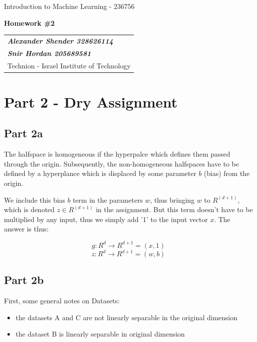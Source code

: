 \documentclass[a4paper]{iacas}
\begin{document}
\begin{center}
 \large Introduction to Machine Learning - 236756
 \end{center}
\begin{center}
\large\textbf{Homework \#2}
 \end{center}


\begin{tabular}{l}
\\
{\bf\textit{Alexander Shender 328626114}} \\
{\bf\textit{Snir Hordan 205689581}} \\
Technion - Israel Institute of Technology
\end{tabular}

\vspace{2em}

\section{Part 2 - Dry Assignment}

\subsection{Part 2a}
The halfspace is homogeneous if the hyperpalce which defines them passed through the origin.
Subsequently, the non-homogeneous halfspaces have to be defined by a hyperplance which is displaced by some parameter
$b$ (bias) from the origin.

We include this bias $b$ term in the parameters $w$, thus bringing $w$ to $R^(d+1)$, which is denoted $z \in R^(d+1)$ in the assignment.
But this term doesn't have to be multiplied by any input, thus we simply add '1' to the input vector $x$. The answer is thus:

$$ g : R^d \rightarrow R^{d+1} = (x, 1) $$
$$ z : R^d \rightarrow R^{d+1} = (w, b) $$


\newpage
\subsection{Part 2b}



First, some general notes on Datasets:
\begin{itemize}
  \item the datasets A and C are not linearly separable in the original dimension
  \item the dataset B is linearly separable in original dimension
\end{itemize}
\end{document}

